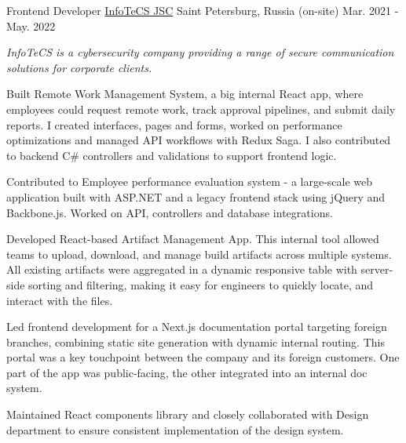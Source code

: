 \begin{cventries}
  \cventry
    {Frontend Developer} %
    {\href{https://infotecs.ru/}{InfoTeCS JSC}}
    {Saint Petersburg, Russia (on-site)} %
    {Mar. 2021 - May. 2022} %
    {
      \begin{cvitems} %
      \vspace{8pt}
      \item[] {\small\textit{InfoTeCS is a cybersecurity company providing a range of secure communication solutions for corporate clients.}}
      \vspace{8pt}
        \item {Built Remote Work Management System, a big internal React app, where employees could request remote work, track approval pipelines, and submit daily reports. I created interfaces, pages and forms, worked on performance optimizations and managed API workflows with Redux Saga. I also contributed to backend C\# controllers and validations to support frontend logic. }
        \item {Contributed to Employee performance evaluation system - a large-scale web application built with ASP.NET and a legacy frontend stack using jQuery and Backbone.js. Worked on API, controllers and database integrations.}
        \item {Developed React-based Artifact Management App. This internal tool allowed teams to upload, download, and manage build artifacts across multiple systems. All existing artifacts were aggregated in a dynamic responsive table with server-side sorting and filtering, making it easy for engineers to quickly locate, and interact with the files.}
        \item {Led frontend development for a Next.js documentation portal targeting foreign branches, combining static site generation with dynamic internal routing. This portal was a key touchpoint between the company and its foreign customers. One part of the app was public-facing, the other integrated into an internal doc system.}
        \item {Maintained React components library and closely collaborated with Design department to ensure consistent implementation of the design system.}
      \end{cvitems}
    }
    {\vspace{24pt}}


\end{cventries}
